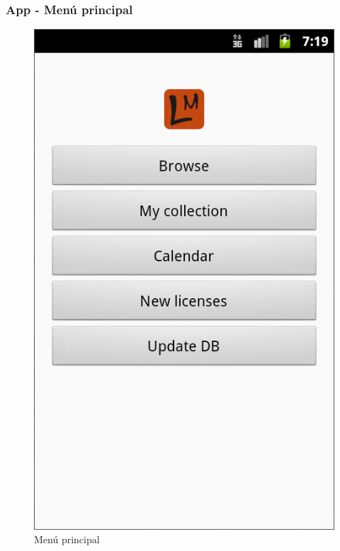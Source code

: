 \documentclass{beamer}
\begin{document}
	\begin{frame}
	\frametitle{App - Menú principal}
		\begin{figure}
			\centering
			\includegraphics[scale=0.23]{main_menu.png}
			\caption{Menú principal}	
		\end{figure}
	\end{frame}
\end{document}
